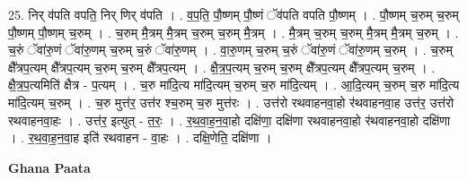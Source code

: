 \documentclass[17pt]{extarticle}
\begin{document}
25. निर् व॑पति वपति॒ निर् णिर् व॑पति । . व॒प॒ति॒ पौ॒ष्णम् पौ॒ष्णं ॅव॑पति वपति पौ॒ष्णम् । . पौ॒ष्णम् च॒रुम् च॒रुम् पौ॒ष्णम् पौ॒ष्णम् च॒रुम् । . च॒रुम् मै॒त्रम् मै॒त्रम् च॒रुम् च॒रुम् मै॒त्रम् । . मै॒त्रम् च॒रुम् च॒रुम् मै॒त्रम् मै॒त्रम् च॒रुम् । . च॒रुं ॅवा॑रु॒णं ॅवा॑रु॒णम् च॒रुम् च॒रुं ॅवा॑रु॒णम् । . वा॒रु॒णम् च॒रुम् च॒रुं ॅवा॑रु॒णं ॅवा॑रु॒णम् च॒रुम् । . च॒रुम् क्षै᳚त्रप॒त्यम् क्षै᳚त्रप॒त्यम् च॒रुम् च॒रुम् क्षै᳚त्रप॒त्यम् । . क्षै॒त्र॒प॒त्यम् च॒रुम् च॒रुम् क्षै᳚त्रप॒त्यम् क्षै᳚त्रप॒त्यम् च॒रुम् । . क्षै॒त्र॒प॒त्यमिति॑ क्षैत्र - प॒त्यम् । . च॒रु मा॑दि॒त्य मा॑दि॒त्यम् च॒रुम् च॒रु मा॑दि॒त्यम् । . आ॒दि॒त्यम् च॒रुम् च॒रु मा॑दि॒त्य मा॑दि॒त्यम् च॒रुम् । . च॒रु मुत्त॑र॒ उत्त॑र श्च॒रुम् च॒रु मुत्त॑रः । . उत्त॑रो रथवाहनवा॒हो र॑थवाहनवा॒ह उत्त॑र॒ उत्त॑रो रथवाहनवा॒हः । . उत्त॑र॒ इत्युत् - त॒रः॒ । . र॒थ॒वा॒ह॒न॒वा॒हो दक्षि॑णा॒ दक्षि॑णा रथवाहनवा॒हो र॑थवाहनवा॒हो दक्षि॑णा । . र॒थ॒वा॒ह॒न॒वा॒ह इति॑ रथवाहन - वा॒हः । . दक्षि॒णेति॒ दक्षि॑णा । \newline

\textbf{Ghana Paata } \newline
\end{document}
